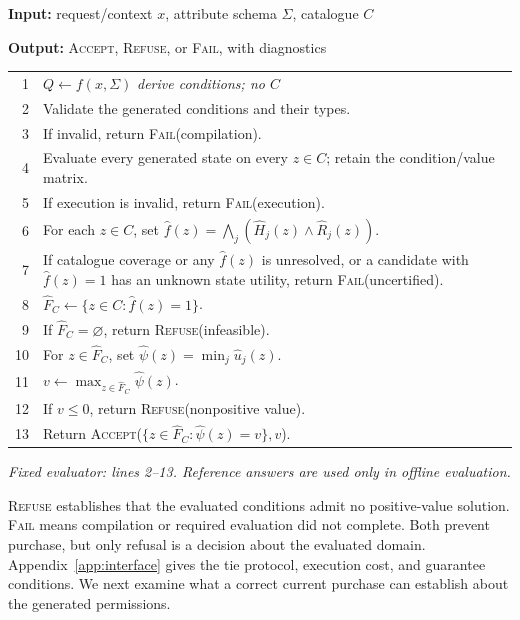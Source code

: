 \begin{algorithm}[t]
\caption{Risk-aware purchase selection}
\label{alg:decision}
\small
\textbf{Input:} request/context $x$, attribute schema $\Sigma$, catalogue $C$\par
\textbf{Output:} \textsc{Accept}, \textsc{Refuse}, or \textsc{Fail}, with diagnostics\par\smallskip
\begin{tabular}{@{}r@{\quad}p{}@{}}
1 & $Q\leftarrow f(x,\Sigma)$ \quad\emph{derive conditions; no $C$}\\
2 & Validate the generated conditions and their types.\\
3 & If invalid, return \textsc{Fail}(compilation).\\
4 & Evaluate every generated state on every $z\in C$; retain the condition/value matrix.\\
5 & If execution is invalid, return \textsc{Fail}(execution).\\
6 & For each $z\in C$, set $\widehat f(z)=\bigwedge_j(\widehat H_j(z)\wedge\widehat R_j(z))$.\\
7 & If catalogue coverage or any $\widehat f(z)$ is unresolved, or a candidate with $\widehat f(z)=1$ has an unknown state utility, return \textsc{Fail}(uncertified).\\
8 & $\widehat F_C\leftarrow\{z\in C:\widehat f(z)=1\}$.\\
9 & If $\widehat F_C=\varnothing$, return \textsc{Refuse}(infeasible).\\
10 & For $z\in\widehat F_C$, set $\widehat\psi(z)=\min_j\widehat u_j(z)$.\\
11 & $v\leftarrow\max_{z\in\widehat F_C}\widehat\psi(z)$.\\
12 & If $v\le0$, return \textsc{Refuse}(nonpositive value).\\
13 & Return \textsc{Accept}($\{z\in\widehat F_C:\widehat\psi(z)=v\},v$).\\
\end{tabular}\smallskip\par
\emph{Fixed evaluator: lines 2--13. Reference answers are used only in offline evaluation.}
\end{algorithm}

\textsc{Refuse} establishes that the evaluated conditions admit no positive-value solution. \textsc{Fail} means compilation or required evaluation did not complete. Both prevent purchase, but only refusal is a decision about the evaluated domain. Appendix~\ref{app:interface} gives the tie protocol, execution cost, and guarantee conditions. We next examine what a correct current purchase can establish about the generated permissions.
